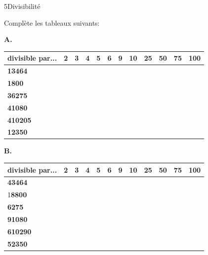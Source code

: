 \begin{exercice}{5}{Divisibilité}

Complète les tableaux suivants:
\bigskip

\textbf{A.}
\bigskip


\begin{tabular}{|l|l|l|l|l|l|l|l|l|l|l|l|} 
\hline
\textbf{divisible par...} & \textbf{2} \; \; & \textbf{3} \; \; & \textbf{4} \; \; & \textbf{5}  \; \;& \textbf{6}  \; \;&  \textbf{9}  \; \;&  \textbf{10} \; \; &  \textbf{25} \; \; &  \textbf{50} \; \; &  \textbf{75} \; \; &  \textbf{100}  \\ 
\hline
\textbf{13464}            &           &           &           &            &  &  &    &    &    &    &      \\ 
\hline
\textbf{1800}            &           &            &           &           &   &   &   &   &   &    &     \\ 
\hline
\textbf{36275}            &            &            &            &           &   &   &    &   &    &   &      \\ 
\hline
\textbf{41080}            &           &            &           &           &   &   &   &    &    &    &      \\ 
\hline
\textbf{410205}           &            &           &            &           &   &   &    &    &    &    &      \\ 
\hline
\textbf{12350}            &           &            &            &           &   &   &   &   &  &    &      \\
\hline
\end{tabular}
\bigskip



\textbf{B.}
\bigskip

\begin{tabular}{|l|l|l|l|l|l|l|l|l|l|l|l|} 
\hline
\textbf{divisible par...} & \textbf{2} \; \; & \textbf{3} \; \; & \textbf{4} \; \; & \textbf{5}  \; \;& \textbf{6}  \; \;&  \textbf{9}  \; \;&  \textbf{10} \; \; &  \textbf{25} \; \; &  \textbf{50} \; \; &  \textbf{75} \; \; &  \textbf{100}  \\ \hline
\textbf{43464}            &           &           &           &            &  &   &    &    &    &    &      \\ 
\hline
1\textbf{8800}            &           &            &           &           &   &   &   &   &   &    &     \\ 
\hline
\textbf{6275}             &            &            &            &           &   &   &    &   &    &   &      \\ 
\hline
\textbf{91080}            &           &           &           &           &  &  &   &    &    &    &      \\ 
\hline
\textbf{610290}           &            &           &            &           &   &  &   &    &    &    &      \\ 
\hline
\textbf{52350}            &           &           &            &           &  &   &   &   &   &    &      \\
\hline
\end{tabular}
\bigskip
\bigskip


\end{exercice}
